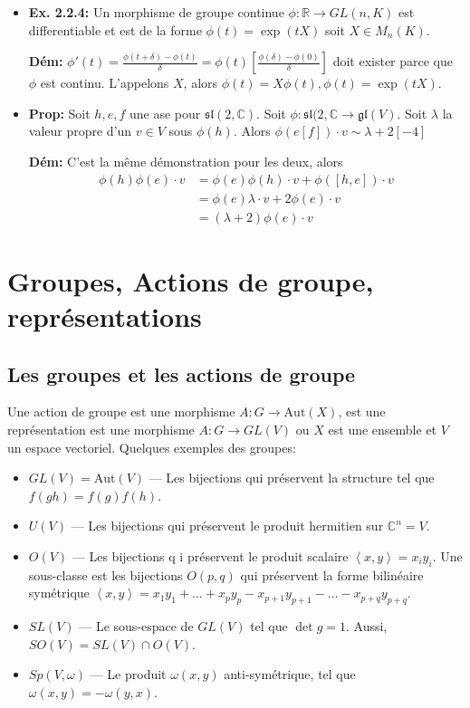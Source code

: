\documentclass[10pt]{report}
\newcommand{\expvalue}[1]{\left<#1\right>}
\begin{document}
\begin{itemize}
    \item \textbf{Ex. 2.2.4:} Un morphisme de groupe continue $\phi: \mathbb{R} \to GL(n,K)$ est differentiable et est de la forme $\phi(t) = \exp(tX)$ soit $X \in M_n(K)$.

        \textbf{D\'em:} $\phi'(t) = \frac{\phi(t + \delta) - \phi(t)}{\delta} = \phi(t)\left[ \frac{\phi(\delta) - \phi(0)}{\delta} \right]$ doit exister parce que $\phi$ est continu. L'appelons $X$, alors $\phi(t) = X\phi(t), \phi(t) = \exp(tX)$.

    \item \textbf{Prop:} Soit $h,e,f$ une ase pour $\mathfrak{sl}(2,\mathbb{C})$. Soit $\phi: \mathfrak{sl}(2,\mathbb{C} \to \mathfrak{gl}(V)$. Soit $\lambda$ la valeur propre d'un $v \in V$ sous $\phi(h)$. Alors $\phi(e[f]) \cdot v \sim \lambda + 2 [-4]$

        \textbf{D\'em:} C'est la m\^eme d\'emonstration pour les deux, alors
        \begin{align}
            \phi(h)\phi(e)\cdot v &= \phi(e)\phi(h) \cdot v + \phi\left( [h,e] \right) \cdot v\\
            &= \phi(e)\lambda \cdot v + 2\phi(e) \cdot v\\
            &= \left( \lambda + 2 \right)\phi(e) \cdot v
        \end{align}
\end{itemize}

\section{Groupes, Actions de groupe, repr\'esentations}

\subsection{Les groupes et les actions de groupe}

Une action de groupe est une morphisme $A: G \to \mathrm{Aut}(X)$, est une repr\'esentation est une morphisme $A: G \to GL(V)$ ou $X$ est une ensemble et $V$ un espace vectoriel. Quelques exemples des groupes:
\begin{itemize}
    \item $GL(V) = \mathrm{Aut}(V)$ --- Les bijections qui pr\'eservent la structure tel que $f(gh) = f(g)f(h)$.
    \item $U(V)$ --- Les bijections qui pr\'eservent le produit hermitien sur $\mathbb{C}^n = V$.
    \item $O(V)$ --- Les bijections q i pr\'eservent le produit scalaire $\expvalue{x,y} = x_iy_i$. Une sous-classe est les bijections $O(p,q)$ qui pr\'eservent la forme bilin\'eaire sym\'etrique $\expvalue{x,y} = x_1y_1 +\dots + x_py_p - x_{p+1}y_{p+1} -\dots -x_{p+q}y_{p+q}$.
    \item $SL(V)$ --- Le sous-espace de $GL(V)$ tel que $\det g = 1$. Aussi, $SO(V) = SL(V) \cap O(V)$.
    \item $Sp(V,\omega)$ --- Le produit $\omega(x,y)$ anti-sym\'etrique, tel que $\omega(x,y) = -\omega(y,x)$.
\end{itemize}
\end{document}
